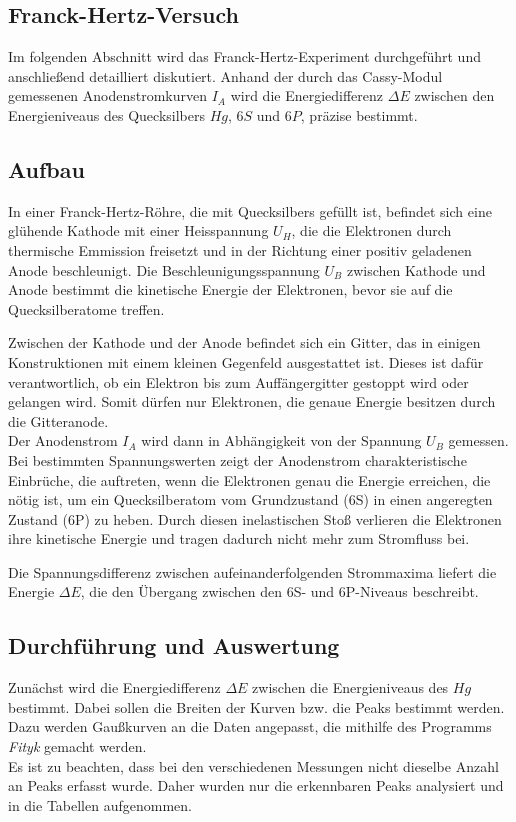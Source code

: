 \documentclass{article}
\begin{document}
\begin{multicols}{2}
\clearpage
\section{Franck-Hertz-Versuch}
Im folgenden Abschnitt wird das Franck-Hertz-Experiment durchgeführt und anschließend detailliert 
diskutiert. Anhand der durch das Cassy-Modul gemessenen Anodenstromkurven \( I_A \) wird die 
Energiedifferenz \( \Delta E \) zwischen den Energieniveaus des Quecksilbers $Hg$, \( 6S \) und \( 6P \), 
präzise bestimmt.
\subsection{Aufbau}
In einer Franck-Hertz-Röhre, die mit Quecksilbers gefüllt ist, befindet sich eine glühende 
Kathode mit einer Heisspannung $U_H$, die die Elektronen durch thermische Emmission freisetzt und in der 
Richtung einer positiv geladenen Anode beschleunigt. Die Beschleunigungsspannung $U_B$ zwischen Kathode 
und Anode bestimmt die kinetische Energie der Elektronen, bevor sie auf die Quecksilberatome treffen.

Zwischen der Kathode und der Anode befindet sich ein Gitter, das in einigen Konstruktionen mit einem kleinen 
Gegenfeld ausgestattet ist. Dieses ist dafür verantwortlich, ob ein Elektron bis zum Auffängergitter 
gestoppt wird oder gelangen wird. Somit dürfen nur Elektronen, die genaue Energie besitzen
durch die Gitteranode. 
\\Der Anodenstrom $I_A$
wird dann in Abhängigkeit von der Spannung $U_B$ gemessen. Bei bestimmten Spannungswerten zeigt 
der Anodenstrom charakteristische Einbrüche, die auftreten, wenn die Elektronen genau die Energie 
erreichen, die nötig ist, um ein Quecksilberatom vom Grundzustand (6S) in einen angeregten 
Zustand (6P) zu heben.
 Durch diesen inelastischen Stoß verlieren die Elektronen ihre kinetische Energie und tragen dadurch nicht mehr zum Stromfluss bei.

Die Spannungsdifferenz zwischen aufeinanderfolgenden Strommaxima liefert die Energie $\Delta E$, die den 
Übergang zwischen den 6S- und 6P-Niveaus beschreibt. 
\subsection{Durchführung und Auswertung}
Zunächst wird die Energiedifferenz $\Delta E$ zwischen die Energieniveaus des $Hg$ bestimmt. 
Dabei sollen die Breiten der Kurven bzw. die Peaks bestimmt werden. Dazu werden Gaußkurven an die Daten angepasst,
die mithilfe des Programms \textit{Fityk} gemacht werden.
\\ Es ist zu beachten, dass bei den verschiedenen Messungen nicht dieselbe Anzahl an Peaks 
erfasst wurde. Daher wurden nur die erkennbaren Peaks analysiert und in die Tabellen 
aufgenommen. 

\end{multicols}
\end{document}
